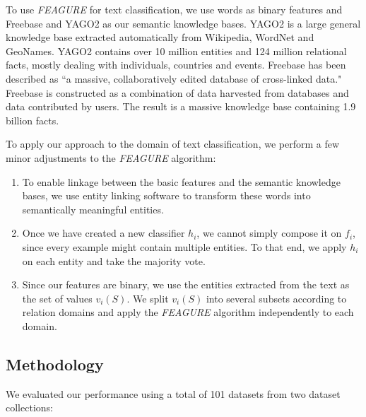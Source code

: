 \documentclass{article}
\theoremstyle{definition}
\begin{document}

To use \emph{FEAGURE} for text classification, we use words as binary features and Freebase and YAGO2 as our semantic knowledge bases.
YAGO2 \citep{hoffart2013yago2} is a large general knowledge base extracted automatically from Wikipedia, WordNet and GeoNames.
YAGO2 contains over 10 million entities and 124 million relational facts, mostly dealing with individuals, countries and events.
Freebase \citep{bollacker2008freebase} has been described as ``a massive, collaboratively edited database of cross-linked data." Freebase is constructed as a combination of data harvested from databases and data contributed by users. The result is a massive knowledge base containing 1.9 billion facts. 

To apply our approach to the domain of text classification, we perform a few minor adjustments to the \emph{FEAGURE} algorithm:
\begin{enumerate}
	\item To enable linkage between the basic features and the semantic knowledge bases, we use entity linking software \citep{hoffart2011robust,milne2013open} to transform these words into semantically meaningful entities.
	\item Once we have created a new classifier $h_i$, we cannot simply compose it on $f_i$, since every example might contain multiple entities. To that end,  we apply $h_i$ on each entity and take the majority vote.
	\item Since our features are binary, we use the entities extracted from the text as the set of values $v_i(S)$. We split $v_i(S)$ into several subsets according to relation domains and apply the \emph{FEAGURE} algorithm independently to each domain. 
\end{enumerate}

\subsection{Methodology}

We evaluated our performance using a total of 101 datasets from two dataset collections:
\end{document}
